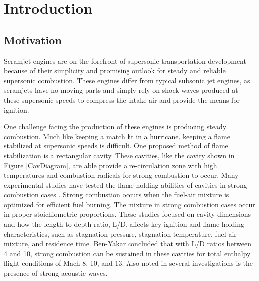 
\chapter{Introduction} %

\label{Chapter2} %



\section{Motivation}

Scramjet engines are on the forefront of supersonic transportation development because of their simplicity and promising outlook for steady and reliable supersonic combustion. These engines differ from typical subsonic jet engines, as scramjets have no moving parts and simply rely on shock waves produced at these supersonic speeds to compress the intake air and provide the means for ignition.

One challenge facing the production of these engines is producing steady combustion. Much like keeping a match lit in a hurricane, keeping a flame stabilized at supersonic speeds is difficult. One proposed method of flame stabilization is a rectangular cavity. These cavities, like the cavity shown in Figure \ref{CavDiagram}, are able provide a re-circulation zone with high temperatures and combustion radicals for strong combustion to occur. Many experimental studies have tested the flame-holding abilities of cavities in strong combustion cases \cite{ben2000experimental,ben2001cavity,do2009plasma,yilmaz2013investigation}. Strong combustion occurs when the fuel-air mixture is optimized for efficient fuel burning. The mixture in strong combustion cases occur in proper stoichiometric proportions. These studies focused on cavity dimensions and how the length to depth ratio, L/D, affects key ignition and flame holding characteristics, such as stagnation pressure, stagnation temperature, fuel air mixture, and residence time. Ben-Yakar concluded that with L/D ratios between 4 and 10, strong combustion can be sustained in these cavities for total enthalpy flight conditions of Mach 8, 10, and 13\cite{ben2001cavity}. Also noted in several investigations is the presence of strong acoustic waves\cite{unalmis2004cavity,heller1996letter,williams2007supersonic, mcgregor1970drag,luo2011drag, sato1999advanced}. 

